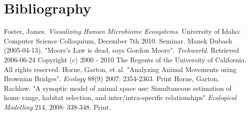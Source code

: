 



\section{Bibliography}

\begin{thebibliography}{99}
 Foster, James. {\em Visualizing Human Microbiome
        Ecosystems}. University of Idaho: Computer Science Colloquium, 
        December 7th 2010. Seminar.	
 Manek Dubash (2005-04-13). "Moore's Law is dead, says 
	Gordon Moore". {\em Techworld}. Retrieved 2006-06-24
 Copyright (c) 2000 - 2010 The Regents of the University of California. All rights reserved.
 Horne, Garton, et al. "Analyzing Animal Movements using Brownian 
	Bridges". { \em Ecology } 88(9) 2007: 2354-2363. Print
 Horne, Garton, Rachlow. "A synoptic model of animal space use: 
	Simultaneous estimation of home range, habitat selection, and 
	inter/intra-speciﬁc relationships" {\em Ecological Modelling} 
	214, 2008: 338-348. Print.


\end{thebibliography}

